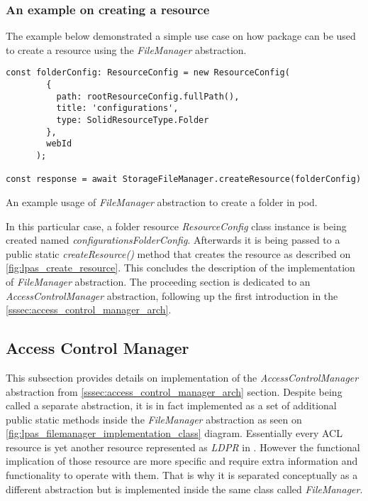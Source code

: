 \subsubsection{An example on creating a resource}

The example below demonstrated a simple use case on how \lpas{} package can be used to create a \solid{} resource using the \textit{FileManager} abstraction. 

\begin{listing}[H]    
\begin{verbatim}
const folderConfig: ResourceConfig = new ResourceConfig(
        {
          path: rootResourceConfig.fullPath(),
          title: 'configurations',
          type: SolidResourceType.Folder
        },
        webId
      );
      
const response = await StorageFileManager.createResource(folderConfig)
\end{verbatim}
\caption{An example usage of \textit{FileManager} abstraction to create a folder in \solid{} pod.} 
\label{lst:resource_generation_example}
\end{listing}

In this particular case, a folder resource \textit{ResourceConfig} class instance is being created named \textit{configurationsFolderConfig}. Afterwards it is being passed to a public static \textit{createResource()} method that creates the resource as described on \autoref{fig:lpas_create_resource}. This concludes the description of the implementation of \textit{FileManager} abstraction. The proceeding section is dedicated to an \textit{AccessControlManager} abstraction, following up the first introduction in the \autoref{sssec:access_control_manager_arch}.


\subsection{Access Control Manager}
\label{sssec:access_control_manager_implementation}

This subsection provides details on implementation of the \textit{AccessControlManager} abstraction from \autoref{sssec:access_control_manager_arch} section. Despite being called a separate abstraction, it is in fact implemented as a set of additional public static methods inside the \textit{FileManager} abstraction as seen on \autoref{fig:lpas_filemanager_implementation_class} diagram. Essentially every ACL resource is yet another resource represented as \textit{LDPR} in \solid{}. However the functional implication of those resource are more specific and require extra information and functionality to operate with them. That is why it is separated conceptually as a different abstraction but is implemented inside the same class called \textit{FileManager}. 

